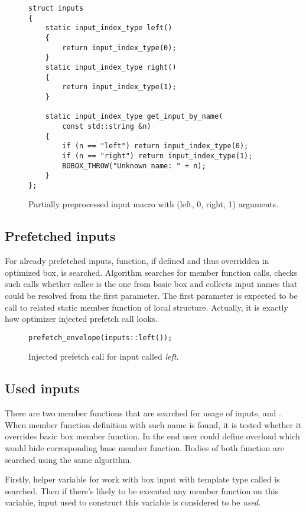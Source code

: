 \begin{figure}[h!]
\caption{Partially preprocessed input macro with (left, 0, right, 1)
 arguments.}
\label{prefetch-input}
\begin{lstlisting}
struct inputs
{
    static input_index_type left()
    {
        return input_index_type(0);
    }
    static input_index_type right()
    {
        return input_index_type(1);
    }

    static input_index_type get_input_by_name(
        const std::string &n)
    {
        if (n == "left") return input_index_type(0);
        if (n == "right") return input_index_type(1);
        BOBOX_THROW("Unknown name: " + n);
    }
};
\end{lstlisting}
\end{figure}

\subsection{Prefetched inputs}
For already prefetched inputs,  function, if defined and thus overridden in optimized box, is searched. Algorithm searches for  member function calls, checks such calls whether callee is the one from basic box and collects input names that could be resolved from the first parameter. The first parameter is expected to be call to related static member function of local  structure. Actually, it is exactly how optimizer injected prefetch call looks.

\begin{figure}[h!]
\caption{Injected prefetch call for input called \emph{left}.}
\label{prefetch-prefetched}
\begin{lstlisting}
prefetch_envelope(inputs::left());
\end{lstlisting}
\end{figure}

\subsection{Used inputs}
There are two member functions that are searched for usage of inputs,  and . When member function definition with such name is found, it is tested whether it overrides basic box member function. In the end user could define overload which would hide corresponding base member function. Bodies of both function are searched using the same algorithm.

Firstly, helper variable for work with box input with template type called 
 is searched. Then if there's likely to be executed any member function on this variable, input used to construct this variable is considered to be \emph{used}.

